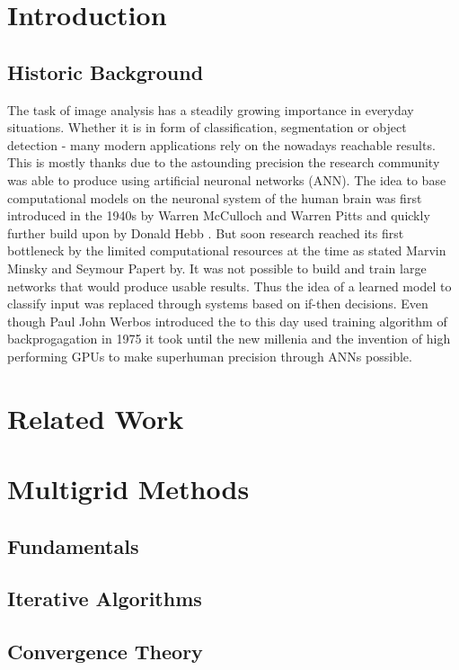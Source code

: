 \documentclass[a4paper,12pt,titlepage,enabledeprecatedfontcommands]{scrreprt}
\begin{document}
\tableofcontents
\listoffigures

\newpage
\setcounter{page}{1}

\chapter{Introduction}
\section{Historic Background}
The task of image analysis has a steadily growing importance in everyday situations. Whether it is in form of classification, segmentation or object detection - many modern applications rely on the nowadays reachable results. This is mostly thanks due to the astounding precision the research community was able to produce using artificial neuronal networks (ANN). The idea to base computational models on the neuronal system of the human brain was first introduced in the 1940s by Warren McCulloch and Warren Pitts \cite{10.5555/65669.104377} and quickly further build upon by Donald Hebb \cite{hebb-organization-of-behavior-1949}. But soon research reached its first bottleneck by the limited computational resources at the time as stated Marvin Minsky and Seymour Papert \cite{minsky69perceptrons} by. It was not possible to build and train large networks that would produce usable results. Thus the idea of a learned model to classify input was replaced through systems based on if-then decisions. Even though Paul John Werbos introduced the to this day used training algorithm of backprogagation in 1975 \cite{werbos1975beyond} it took until the new millenia and the invention of high performing GPUs to make superhuman precision through ANNs possible.
\chapter{Related Work}
\chapter{Multigrid Methods}
\section{Fundamentals}
\section{Iterative Algorithms}
\section{Convergence Theory}
\end{document}
